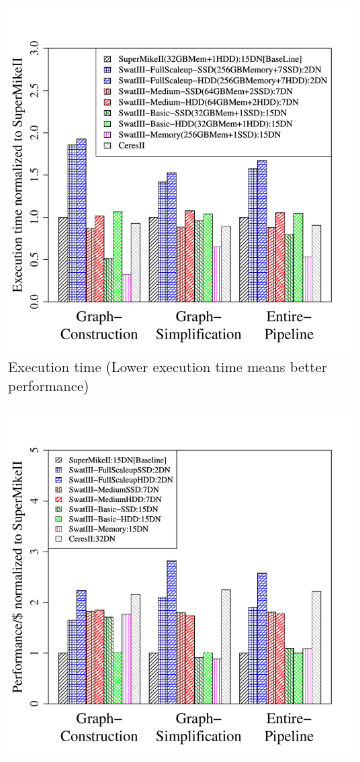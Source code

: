 \documentclass[10pt, conference, compsocconf]{IEEEtran}
\begin{document}
\begin{figure}[htb]
        \begin{subfigure}[b]{0.5\textwidth}
                \includegraphics[width=\textwidth, height=.27\textheight]{Figure/PerormanceData/Plots/PerfDiffArch.pdf}
                \caption{Execution time (Lower execution time means better performance)}
                \label{fig:DifferentArchitecturesPerf}
        \end{subfigure}
        \begin{subfigure}[b]{0.5\textwidth}
                \includegraphics[width=\textwidth, height=.27\textheight]{Figure/PerormanceData/Plots/PerfPerDollarDiffArch.pdf}

\end{subfigure}
\end{figure}
\end{document}
